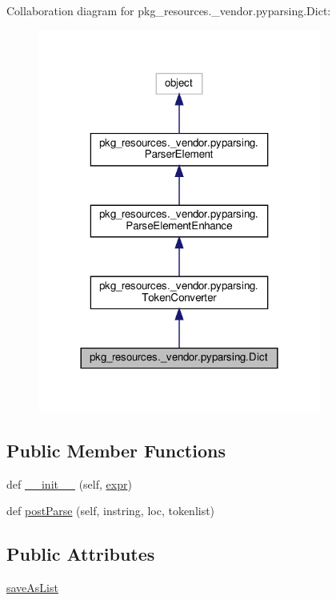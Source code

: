 Collaboration diagram for pkg\+\_\+resources.\+\_\+vendor.\+pyparsing.\+Dict\+:
\nopagebreak
\begin{figure}[H]
\begin{center}
\leavevmode
\includegraphics[width=264pt]{classpkg__resources_1_1__vendor_1_1pyparsing_1_1Dict__coll__graph}
\end{center}
\end{figure}
\subsection*{Public Member Functions}
\begin{DoxyCompactItemize}
\item 
def \hyperlink{classpkg__resources_1_1__vendor_1_1pyparsing_1_1Dict_a9947971188f313f29fcb5e7b17553590}{\+\_\+\+\_\+init\+\_\+\+\_\+} (self, \hyperlink{classpkg__resources_1_1__vendor_1_1pyparsing_1_1ParseElementEnhance_a34e02b3404b2a545ca1be8b522758896}{expr})
\item 
def \hyperlink{classpkg__resources_1_1__vendor_1_1pyparsing_1_1Dict_a409afd6d2b45eafdad3517e5fda85aad}{post\+Parse} (self, instring, loc, tokenlist)
\end{DoxyCompactItemize}
\subsection*{Public Attributes}
\begin{DoxyCompactItemize}
\item 
\hyperlink{classpkg__resources_1_1__vendor_1_1pyparsing_1_1Dict_aad6d9389f9104418a05021ec795f6049}{save\+As\+List}
\end{DoxyCompactItemize}
